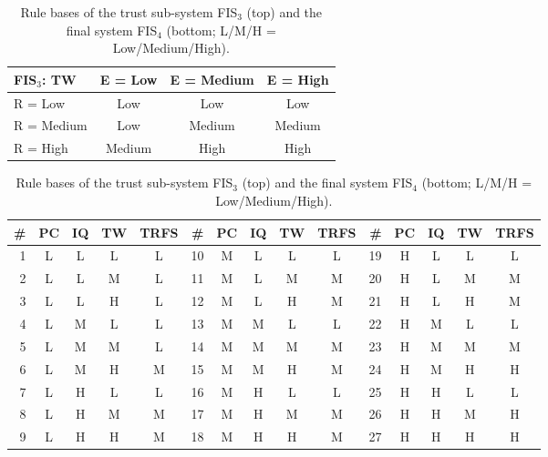 \begin{table}[!htbp]
\centering
\caption{Rule bases of the trust sub-system FIS$_3$ (top) and the final system FIS$_4$ (bottom; L/M/H = Low/Medium/High).}
\label{tab:rules}
\footnotesize
\begin{tabular}{lccc}
\toprule
FIS$_3$: TW & E = Low & E = Medium & E = High\\
\midrule
R = Low & Low & Low & Low\\
R = Medium & Low & Medium & Medium\\
R = High & Medium & High & High\\
\bottomrule
\end{tabular}

\vspace{0.6em}
\setlength{\tabcolsep}{3pt}
\begin{tabular}{rcccc|rcccc|rcccc}
\toprule
\# & PC & IQ & TW & TRFS & \# & PC & IQ & TW & TRFS & \# & PC & IQ & TW & TRFS\\
\midrule
1 & L & L & L & L & 10 & M & L & L & L & 19 & H & L & L & L\\
2 & L & L & M & L & 11 & M & L & M & M & 20 & H & L & M & M\\
3 & L & L & H & L & 12 & M & L & H & M & 21 & H & L & H & M\\
4 & L & M & L & L & 13 & M & M & L & L & 22 & H & M & L & L\\
5 & L & M & M & L & 14 & M & M & M & M & 23 & H & M & M & M\\
6 & L & M & H & M & 15 & M & M & H & M & 24 & H & M & H & H\\
7 & L & H & L & L & 16 & M & H & L & L & 25 & H & H & L & L\\
8 & L & H & M & M & 17 & M & H & M & M & 26 & H & H & M & H\\
9 & L & H & H & M & 18 & M & H & H & M & 27 & H & H & H & H\\
\bottomrule
\end{tabular}
\end{table}
